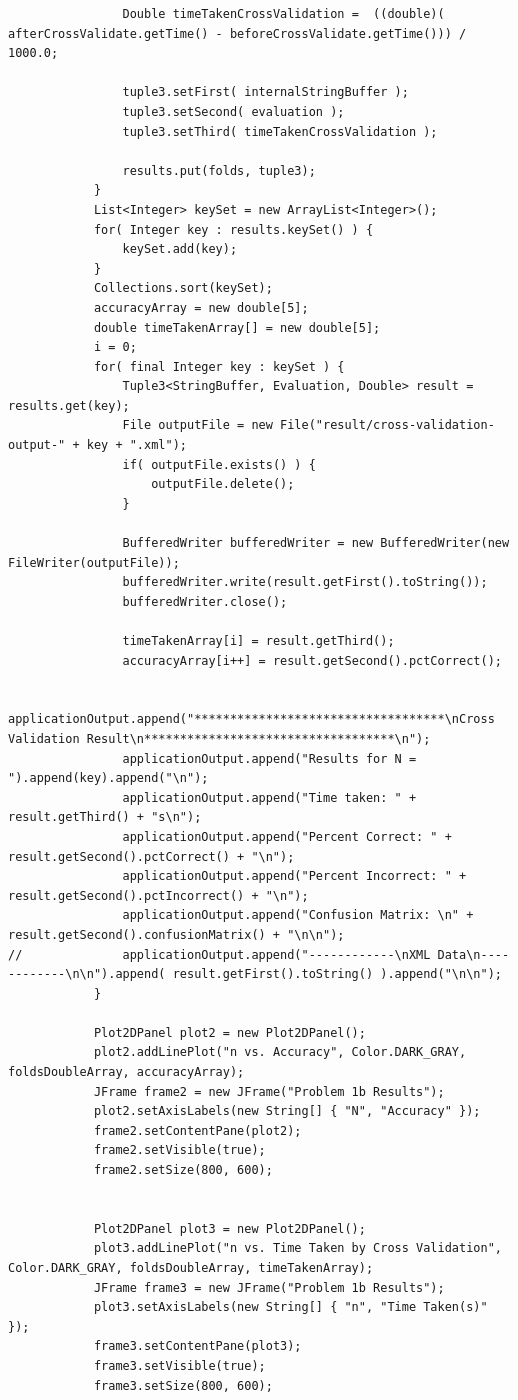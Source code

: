 \begin{lstlisting}
				Double timeTakenCrossValidation =  ((double)( afterCrossValidate.getTime() - beforeCrossValidate.getTime())) / 1000.0;
				
				tuple3.setFirst( internalStringBuffer );
				tuple3.setSecond( evaluation );
				tuple3.setThird( timeTakenCrossValidation );
				
				results.put(folds, tuple3);
			}
			List<Integer> keySet = new ArrayList<Integer>();
			for( Integer key : results.keySet() ) {
				keySet.add(key);
			}
			Collections.sort(keySet);
			accuracyArray = new double[5];
			double timeTakenArray[] = new double[5];
			i = 0;
			for( final Integer key : keySet ) {
				Tuple3<StringBuffer, Evaluation, Double> result = results.get(key);
				File outputFile = new File("result/cross-validation-output-" + key + ".xml");
				if( outputFile.exists() ) {
					outputFile.delete();
				}
				
				BufferedWriter bufferedWriter = new BufferedWriter(new FileWriter(outputFile));
				bufferedWriter.write(result.getFirst().toString());
				bufferedWriter.close();
				
				timeTakenArray[i] = result.getThird();
				accuracyArray[i++] = result.getSecond().pctCorrect();
				
				applicationOutput.append("***********************************\nCross Validation Result\n***********************************\n");
				applicationOutput.append("Results for N = ").append(key).append("\n");
				applicationOutput.append("Time taken: " + result.getThird() + "s\n");
				applicationOutput.append("Percent Correct: " + result.getSecond().pctCorrect() + "\n");
				applicationOutput.append("Percent Incorrect: " + result.getSecond().pctIncorrect() + "\n");
				applicationOutput.append("Confusion Matrix: \n" + result.getSecond().confusionMatrix() + "\n\n");
//				applicationOutput.append("------------\nXML Data\n------------\n\n").append( result.getFirst().toString() ).append("\n\n");
			}
			
			Plot2DPanel plot2 = new Plot2DPanel();
			plot2.addLinePlot("n vs. Accuracy", Color.DARK_GRAY, foldsDoubleArray, accuracyArray);
			JFrame frame2 = new JFrame("Problem 1b Results");
			plot2.setAxisLabels(new String[] { "N", "Accuracy" });
			frame2.setContentPane(plot2);
			frame2.setVisible(true);
			frame2.setSize(800, 600);

			
			Plot2DPanel plot3 = new Plot2DPanel();
			plot3.addLinePlot("n vs. Time Taken by Cross Validation", Color.DARK_GRAY, foldsDoubleArray, timeTakenArray);
			JFrame frame3 = new JFrame("Problem 1b Results");
			plot3.setAxisLabels(new String[] { "n", "Time Taken(s)" });
			frame3.setContentPane(plot3);
			frame3.setVisible(true);
			frame3.setSize(800, 600);
			

\end{lstlisting}
